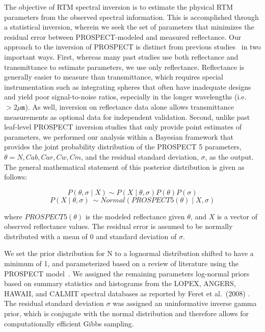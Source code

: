 The objective of RTM spectral inversion is to estimate the physical RTM parameters from the observed spectral information.
This is accomplished through a statistical inversion, wherein we seek the set of parameters that minimizes the residual error between PROSPECT-modeled and measured reflectance.
Our approach to the inversion of PROSPECT is distinct from previous studies~\cite{combal_2003_retrieval,feret_2008_prospect,feret_2011_optimizing,li_2011_retrieval,li_2013_retrieval} in two important ways.
First, whereas many past studies use both reflectance and transmittance to estimate parameters, we use only reflectance.
Reflectance is generally easier to measure than transmittance, which requires special instrumentation such as integrating spheres that often have inadequate designs and yield poor signal-to-noise ratios, especially in the longer wavelengths (i.e.\ $> 2 \mu \texttt{m}$).
As well, inversion on reflectance data alone allows transmittance measurements as optional data for independent validation.
Second, unlike past leaf-level PROSPECT inversion studies that only provide point estimates of parameters, we performed our analysis within a Bayesian framework that provides the joint probability distribution of the PROSPECT 5 parameters, $\theta = {N, Cab, Car, Cw, Cm}$, and the residual standard deviation, $\sigma$, as the output.
The general mathematical statement of this posterior distribution is given as follows:

\[ P(\theta, \sigma \mid X) \sim P(X \mid \theta, \sigma)P(\theta)P(\sigma) \]
\[ P(X \mid \theta, \sigma)\ \sim Normal(PROSPECT5(\theta) \mid X, \sigma) \]

where $PROSPECT5(\theta)$ is the modeled reflectance given $\theta$, and $X$ is a vector of observed reflectance values.
The residual error is assumed to be normally distributed with a mean of 0 and standard deviation of $\sigma$.

We set the prior distribution for N to a lognormal distribution shifted to have a minimum of 1, and parameterized based on a review of literature using the PROSPECT model~\cite{lemaire_2004_towards,ferreira_2013_analyzing,croft_2014_applicability}.%
We assigned the remaining parameters log-normal priors based on summary statistics and histograms from the LOPEX, ANGERS, HAWAII, and CALMIT spectral databases as reported by Feret et al.~(2008) \nocite{feret_2008_prospect}.%
The residual standard deviation $\sigma$ was assigned an uninformative inverse gamma prior, which is conjugate with the normal distribution and therefore allows for computationally efficient Gibbs sampling.

